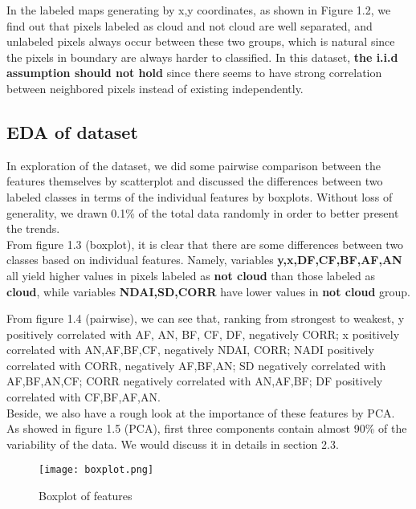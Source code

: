 \documentclass[11pt]{scrartcl} %
\begin{document}
In the labeled maps generating by x,y coordinates, as shown in Figure 1.2, we find out that pixels labeled as cloud and not cloud are well separated, and unlabeled pixels always occur between these two groups, which is natural since the pixels in boundary are always harder to classified. In this dataset, \textbf{the i.i.d assumption should not hold} since there seems to have strong correlation between neighbored pixels instead of existing independently.





\subsection{EDA of dataset}
In exploration of the dataset, we did some pairwise comparison between the features themselves by scatterplot and discussed the differences between two labeled classes in terms of the individual features by boxplots. Without loss of generality, we drawn 0.1\% of the total data randomly in order to better present the trends.\\

From figure 1.3 (boxplot), it is clear that there are some differences between two classes based on individual features. Namely, variables \textbf{y,x,DF,CF,BF,AF,AN} all yield higher values in pixels labeled as \textbf{not cloud} than those labeled as \textbf{cloud}, while variables \textbf{NDAI,SD,CORR} have lower values in \textbf{not cloud} group.

From figure 1.4 (pairwise), we can see that, ranking from strongest to weakest, y positively correlated with AF, AN, BF, CF, DF, negatively CORR; x positively correlated with AN,AF,BF,CF, negatively NDAI, CORR; NADI positively correlated with CORR, negatively AF,BF,AN; SD negatively correlated with AF,BF,AN,CF; CORR negatively correlated with AN,AF,BF; DF positively correlated with CF,BF,AF,AN. \\

Beside, we also have a rough look at the importance of these features by PCA. As showed in figure 1.5 (PCA), first three components contain almost 90\% of the variability of the data. We would discuss it in details in section 2.3.\\

\begin{figure}[htb]
	\centering
	\texttt{[image: boxplot.png]} %
	\caption{Boxplot of features}
\end{figure}
\end{document}
